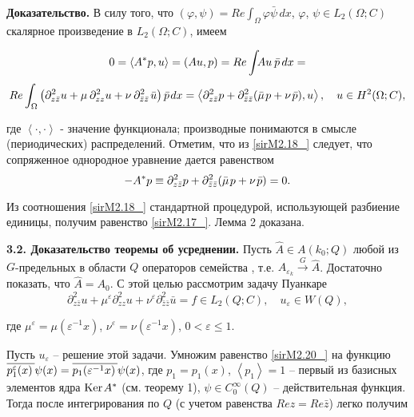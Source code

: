 \textbf{Доказательство. }В силу  того, что $(\varphi ,\psi )=Re\int _{\Omega }\varphi \bar{\psi }\, dx $,  $\varphi $, $\psi \in L_{2} (\Omega ;C)$ скалярное произведение в $L_{2} (\Omega ;C)$, имеем

\begin{equation*}
0=\left\langle A^{*} p,u\right\rangle =\left(Au,p\right)=Re\int _{}Au{\kern 1pt} {\kern 1pt} \bar{p} \, dx=
\end{equation*}
\begin{equation}
\label{sirM2.18_}
Re\int _{\Omega }\left(\partial _{z\bar{z}}^{2} u+\mu {\kern 1pt} {\kern 1pt} \partial _{zz}^{2} u+\nu {\kern 1pt} {\kern 1pt} \partial _{\bar{z}\bar{z}}^{2} {\kern 1pt} \bar{u}\right)\bar{p}{\kern 1pt} dx =\left\langle \partial _{z\bar{z}}^{2} p+\partial _{\bar{z}\bar{z}}^{2} (\bar{\mu }{\kern 1pt} p+\nu {\kern 1pt} \bar{p}),u\right\rangle ,   \quad u\in H^{2} (\Omega ;C),             \end{equation}

где  $\left\langle \cdot ,\cdot \right\rangle $ - значение функционала; производные понимаются в смысле (периодических)  распределений.    Отметим, что из  \eqref{sirM2.18_} следует, что сопряженное однородное уравнение дается равенством
\begin{equation}
\label{sirM2.19_}
-A^{*} p\equiv \partial _{z\bar{z}}^{2} p+\partial _{\bar{z}\bar{z}}^{2} (\bar{\mu }{\kern 1pt} p+\nu {\kern 1pt} \bar{p})=0.                               \end{equation}

Из соотношения \eqref{sirM2.18_} стандартной процедурой, использующей разбиение единицы, получим равенство  \eqref{sirM2.17_}. Лемма 2 доказана.

\textbf{3.2. Доказательство теоремы об усреднении.} Пусть $\hat{A}\in A(k_{0} ;Q)$ любой из $G$-предельных в области $Q$ операторов семейства , т.е. $A_{\varepsilon _{k} } \stackrel{G}{\longrightarrow} \hat{A}$. Достаточно показать, что $\hat{A}=A_{0} $. С этой целью рассмотрим задачу Пуанкаре
\begin{equation}
\label{sirM2.20_}
\partial _{z\bar{z}}^{2} u+\mu ^{\varepsilon } \partial _{zz}^{2} u+\nu ^{\varepsilon } \partial _{\bar{z}\bar{z}}^{2} \bar{u}=f\in L_{2} (Q;C), \quad u_{\varepsilon } \in W(Q),
\end{equation}

где $\mu ^{\varepsilon } =\mu (\varepsilon ^{-1} x)$, $\nu ^{\varepsilon } =\nu (\varepsilon ^{-1} x)$, $0<\varepsilon \le 1$.

Пусть $u_{\varepsilon } $ --  решение этой задачи. Умножим равенство  \eqref{sirM2.20_} на функцию $\overline{p_{1}^{\varepsilon } (x){\kern 1pt} {\kern 1pt} }\psi (x)=\overline{p_{1} (\varepsilon ^{-1} x){\kern 1pt} {\kern 1pt} }\psi (x)$,  где $p_{1} =p_{1} (x)$, $\left\langle p_{1} \right\rangle =1$ --  первый из базисных элементов ядра $\mathrm{ Ker}{\kern 1pt} A^{*}$  (см. теорему 1), $\psi \in C_{0}^{\infty } (Q)$ -- действительная функция. Тогда после интегрирования по $Q$ (с учетом равенства $Rez=Re\bar{z}$) легко получим

